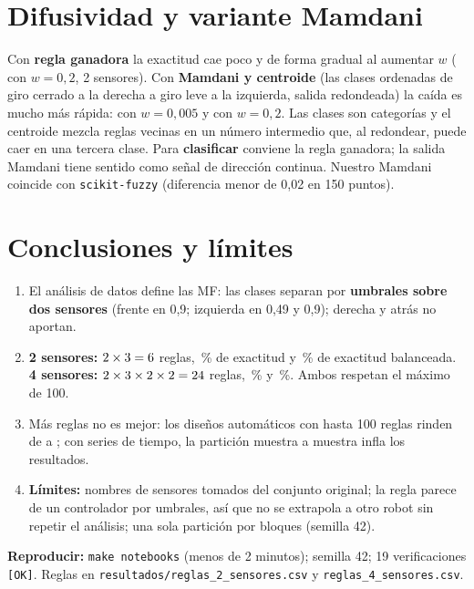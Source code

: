 \documentclass[11pt,letterpaper]{article}
\begin{document}
\begin{table}[H]
\centering\small
\caption{Exactitud en prueba con partición por bloques frente a partición muestra a muestra.}

\end{table}

\section{Difusividad y variante Mamdani}

Con \textbf{regla ganadora} la exactitud cae poco y de forma gradual al aumentar $w$ (\cifraadicGanadoraDosGrande{} con $w=0{,}2$, 2 sensores). Con \textbf{Mamdani y centroide} (las clases ordenadas de giro cerrado a la derecha a giro leve a la izquierda, salida redondeada) la caída es mucho más rápida:
\cifraadicMamdaniDosCero{} con $w=0{,}005$ y \cifraadicMamdaniDosGrande{} con $w=0{,}2$. Las clases son categorías y el centroide mezcla reglas vecinas en un número intermedio que, al redondear, puede caer en una tercera clase. Para \textbf{clasificar} conviene la regla ganadora;
la salida Mamdani tiene sentido como señal de dirección continua. Nuestro Mamdani coincide con \texttt{scikit-fuzzy} (diferencia menor de 0,02 en 150 puntos).

\begin{table}[H]
\centering\small
\caption{Exactitud en prueba según la difusividad $w$ y la forma de producir la salida.}

\end{table}

\section{Conclusiones y límites}
\begin{enumerate}
  \item El análisis de datos define las MF: las clases separan por \textbf{umbrales sobre dos sensores} (frente en 0,9; izquierda en 0,49 y 0,9); derecha y atrás no aportan.
  \item \textbf{2 sensores:} $2\times3=6$ reglas, \cifraadicDosAcc\,\% de exactitud y \cifraadicDosBal\,\% de exactitud balanceada. \textbf{4 sensores:} $2\times3\times2\times2=24$ reglas, \cifraadicCuatroAcc\,\% y \cifraadicCuatroBal\,\%. Ambos respetan el máximo de 100.
  \item Más reglas no es mejor: los diseños automáticos con hasta 100 reglas rinden de \cifraadicAutoCuatroMin{} a \cifraadicAutoDosMax; con series de tiempo, la partición muestra a muestra infla los resultados.
  \item \textbf{Límites:} nombres de sensores tomados del conjunto original; la regla parece de un controlador por umbrales, así que no se extrapola a otro robot sin repetir el análisis; una sola partición por bloques (semilla 42).
\end{enumerate}

\textbf{Reproducir:} \texttt{make notebooks} (menos de 2 minutos); semilla 42; 19 verificaciones \texttt{[OK]}. Reglas en \texttt{resultados/reglas\_2\_sensores.csv} y \texttt{reglas\_4\_sensores.csv}.
\end{document}
